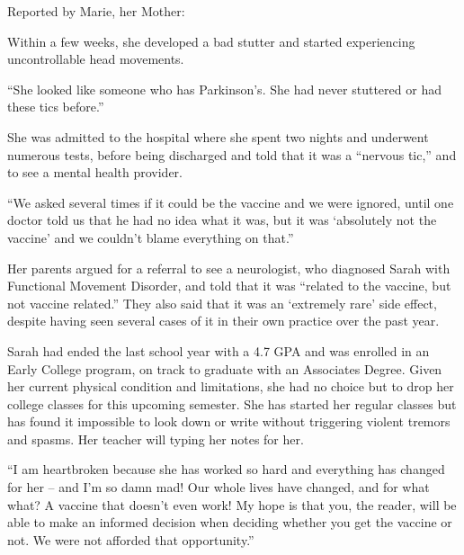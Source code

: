 Reported by Marie, her Mother:

Within a few weeks, she developed a bad stutter and started experiencing
uncontrollable head movements.

“She looked like someone who has Parkinson’s. She had never stuttered or had
these tics before.”

She was admitted to the hospital where she spent two nights and underwent
numerous tests, before being discharged and told that it was a “nervous tic,”
and to see a mental health provider.

“We asked several times if it could be the vaccine and we were ignored, until
one doctor told us that he had no idea what it was, but it was ‘absolutely not
the vaccine’ and we couldn’t blame everything on that.”

Her parents argued for a referral to see a neurologist, who diagnosed Sarah with
Functional Movement Disorder, and told that it was “related to the vaccine, but
not vaccine related.” They also said that it was an ‘extremely rare’ side
effect, despite having seen several cases of it in their own practice over the
past year.

Sarah had ended the last school year with a 4.7 GPA and was enrolled in an Early
College program, on track to graduate with an Associates Degree. Given her
current physical condition and limitations, she had no choice but to drop her
college classes for this upcoming semester. She has started her regular classes
but has found it impossible to look down or write without triggering violent
tremors and spasms. Her teacher will typing her notes for her.

“I am heartbroken because she has worked so hard and everything has changed for
her – and I’m so damn mad! Our whole lives have changed, and for what what? A
vaccine that doesn’t even work! My hope is that you, the reader, will be able to
make an informed decision when deciding whether you get the vaccine or not. We
were not afforded that opportunity.”


